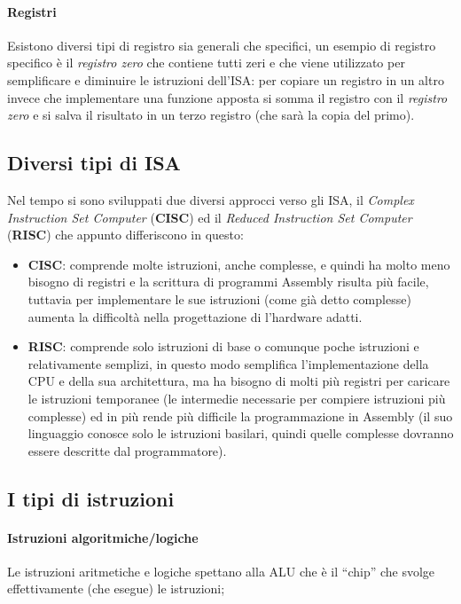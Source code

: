 \paragraph*{Registri}
Esistono diversi tipi di registro sia generali che specifici, un esempio di registro specifico è il \textit{registro zero} che contiene tutti zeri e che viene utilizzato per semplificare e diminuire le istruzioni dell’ISA: per copiare un registro in un altro invece che implementare una funzione apposta si somma il registro con il \textit{registro zero} e si salva il risultato in un terzo registro (che sarà la copia del primo).

\subsection{Diversi tipi di ISA}
Nel tempo si sono sviluppati due diversi approcci verso  gli ISA, il \textit{Complex Instruction Set Computer} (\textbf{CISC}) ed il \textit{Reduced Instruction Set Computer} (\textbf{RISC}) che appunto differiscono in questo:
\begin{itemize}[noitemsep]
	\item \textbf{CISC}: comprende molte istruzioni, anche complesse, e quindi ha molto meno bisogno di registri e la scrittura di programmi Assembly risulta più facile, tuttavia per implementare le sue istruzioni (come già detto complesse) aumenta la difficoltà nella progettazione di l’hardware adatti.
	\item \textbf{RISC}: comprende solo istruzioni di base o comunque poche istruzioni e relativamente semplizi, in questo modo semplifica l’implementazione della CPU e della sua architettura, ma ha bisogno di molti più registri per caricare le istruzioni temporanee (le intermedie necessarie per compiere istruzioni più complesse) ed in più rende più difficile la programmazione in Assembly (il suo linguaggio conosce solo le istruzioni basilari, quindi quelle complesse dovranno essere descritte dal programmatore).
\end{itemize}

\subsection{I tipi di istruzioni}
\paragraph*{Istruzioni algoritmiche/logiche}
Le istruzioni aritmetiche e logiche spettano alla ALU che è il “chip” che svolge effettivamente (che esegue) le istruzioni;
